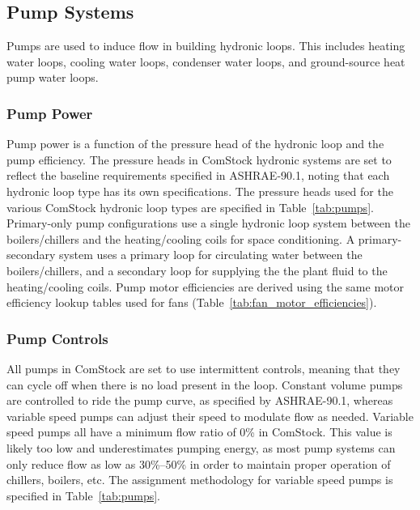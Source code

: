 \subsection{Pump Systems}

Pumps are used to induce flow in building hydronic loops. This includes heating water loops, cooling water loops, condenser water loops, and ground-source heat pump water loops.

\subsubsection{Pump Power}

Pump power is a function of the pressure head of the hydronic loop and the pump efficiency. The pressure heads in ComStock hydronic systems are set to reflect the baseline requirements specified in ASHRAE-90.1, noting that each hydronic loop type has its own specifications. The pressure heads used for the various ComStock hydronic loop types are specified in Table~\ref{tab:pumps}. Primary-only pump configurations use a single hydronic loop system between the boilers/chillers and the heating/cooling coils for space conditioning. A primary-secondary system uses a primary loop for circulating water between the boilers/chillers, and a secondary loop for supplying the the plant fluid to the heating/cooling coils. Pump motor efficiencies are derived using the same motor efficiency lookup tables used for fans (Table~\ref{tab:fan_motor_efficiencies}).

\subsubsection{Pump Controls}

All pumps in ComStock are set to use intermittent controls, meaning that they can cycle off when there is no load present in the loop. Constant volume pumps are controlled to ride the pump curve, as specified by ASHRAE-90.1, whereas variable speed pumps can adjust their speed to modulate flow as needed. Variable speed pumps all have a minimum flow ratio of 0\% in ComStock. This value is likely too low and underestimates pumping energy, as most pump systems can only reduce flow as low as 30\%--50\% in order to maintain proper operation of chillers, boilers, etc. The assignment methodology for variable speed pumps is specified in Table~\ref{tab:pumps}.




